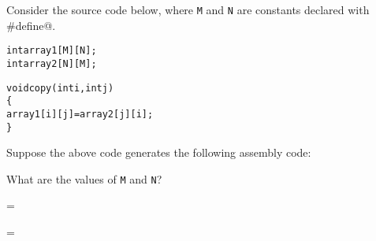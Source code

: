 \begin{problem}{8}

Consider the source code below, where {\tt M} and {\tt N} are
constants declared with \verb@#define@.

\begin{ccode}
\begin{alltt}
int array1[M][N];
int array2[N][M];

void copy(int i, int j)
\verb:{:
    array1[i][j] = array2[j][i];
\verb:}:
\end{alltt}
\end{ccode}

Suppose the above code generates the following assembly code:



What are the values of {\tt M} and {\tt N}?       

\bigskip
\hspace{1cm}{\tt M} =

\bigskip
\hspace{1cm}{\tt N} =


\end{problem}

